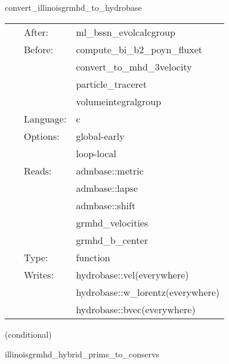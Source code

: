 \hspace{5mm} convert\_illinoisgrmhd\_to\_hydrobase 

\hspace{5mm}{\it convert illinoisgrmhd-native variables to hydrobase } 


\hspace{5mm}

 \begin{tabular*}{160mm}{cll} 
~ & After:  & ml\_bssn\_evolcalcgroup \\ 
~ & Before:  & compute\_bi\_b2\_poyn\_fluxet \\ 
~& ~ &convert\_to\_mhd\_3velocity\\ 
~& ~ &particle\_traceret\\ 
~& ~ &volumeintegralgroup\\ 
~ & Language:  & c \\ 
~ & Options:  & global-early \\ 
~& ~ &loop-local\\ 
~ & Reads:  & admbase::metric \\ 
~& ~ &admbase::lapse\\ 
~& ~ &admbase::shift\\ 
~& ~ &grmhd\_velocities\\ 
~& ~ &grmhd\_b\_center\\ 
~ & Type:  & function \\ 
~ & Writes:  & hydrobase::vel(everywhere) \\ 
~& ~ &hydrobase::w\_lorentz(everywhere)\\ 
~& ~ &hydrobase::bvec(everywhere)\\ 
\end{tabular*} 


\vspace{5mm}

   (conditional) 

\hspace{5mm} illinoisgrmhd\_hybrid\_prims\_to\_conservs 

\hspace{5mm}{\it hybrid version of illinoisgrmhd\_prims\_to\_conservs } 


\hspace{5mm}

